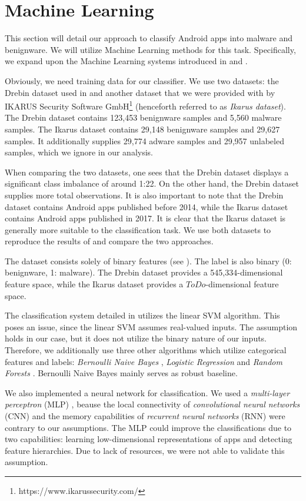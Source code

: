 \section{Machine Learning}
This section will detail our approach to classify Android apps into malware and benignware. We will utilize Machine Learning methods for this task. Specifically, we expand upon the Machine Learning systems introduced in \cite{drebin} and \cite{7917369}.

Obviously, we need training data for our classifier. We use two datasets: the Drebin dataset used in \cite{drebin} and another dataset that we were provided with by IKARUS Security Software GmbH\footnote{https://www.ikarussecurity.com/} (henceforth referred to as \emph{Ikarus dataset}). The Drebin dataset contains 123,453 benignware samples and 5,560 malware samples. The Ikarus dataset contains 29,148 benignware samples and 29,627 samples. It additionally supplies 29,774 adware samples and 29,957 unlabeled samples, which we ignore in our analysis.

When comparing the two datasets, one sees that the Drebin dataset displays a significant class imbalance of around 1:22. On the other hand, the Drebin dataset supplies more total observations. It is also important to note that the Drebin dataset contains Android apps published before 2014, while the Ikarus dataset contains Android apps published in 2017. It is clear that the Ikarus dataset is generally more suitable to the classification task. We use both datasets to reproduce the results of \cite{drebin} and compare the two approaches.

The dataset consists solely of binary features (see ). The label is also binary (0: benignware, 1: malware). The Drebin dataset provides a 545,334-dimensional feature space, while the Ikarus dataset provides a $ToDo$-dimensional feature space.

The classification system detailed in \cite{drebin} utilizes the linear SVM algorithm. This poses an issue, since the linear SVM assumes real-valued inputs. The assumption holds in our case, but it does not utilize the binary nature of our inputs. Therefore, we additionally use three other algorithms which utilize categorical features and labels: \emph{Bernoulli Naive Bayes} \cite{Manning:2008:IIR:1394399}, \emph{Logistic Regression} \cite{10.2307/2983890} and \emph{Random Forests} \cite{598994}. Bernoulli Naive Bayes mainly serves as robust baseline.

We also implemented a neural network for classification. We used a \emph{multi-layer perceptron} (MLP) \cite{rosenblatt1958}, beause the local connectivity of \emph{convolutional neural networks} (CNN) \cite{Fukushima1980} and the memory capabilities of \emph{recurrent neural networks} (RNN) \cite{doi:10.1162/neco.1997.9.8.1735} were contrary to our assumptions. The MLP could improve the classifications due to two capabilities: learning low-dimensional representations of apps and detecting feature hierarchies. Due to lack of resources, we were not able to validate this assumption.